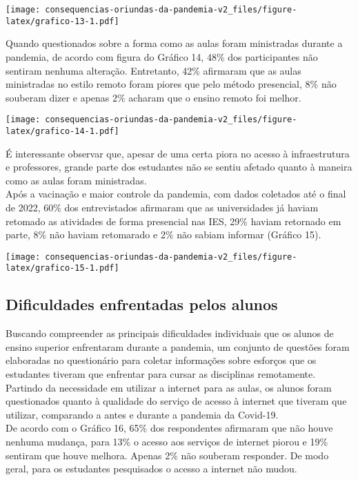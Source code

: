 \documentclass[
]{article}
\begin{document}
\texttt{[image: consequencias-oriundas-da-pandemia-v2\_files/figure-latex/grafico-13-1.pdf]}

Quando questionados sobre a forma como as aulas foram ministradas
durante a pandemia, de acordo com figura do Gráfico 14, 48\% dos
participantes não sentiram nenhuma alteração. Entretanto, 42\% afirmaram
que as aulas ministradas no estilo remoto foram piores que pelo método
presencial, 8\% não souberam dizer e apenas 2\% acharam que o ensino
remoto foi melhor.

\texttt{[image: consequencias-oriundas-da-pandemia-v2\_files/figure-latex/grafico-14-1.pdf]}

É interessante observar que, apesar de uma certa piora no acesso à
infraestrutura e professores, grande parte dos estudantes não se sentiu
afetado quanto à maneira como as aulas foram ministradas.\\
Após a vacinação e maior controle da pandemia, com dados coletados até o
final de 2022, 60\% dos entrevistados afirmaram que as universidades já
haviam retomado as atividades de forma presencial nas IES, 29\% haviam
retornado em parte, 8\% não haviam retomarado e 2\% não sabiam informar
(Gráfico 15).

\texttt{[image: consequencias-oriundas-da-pandemia-v2\_files/figure-latex/grafico-15-1.pdf]}

\hypertarget{dificuldades-enfrentadas-pelos-alunos}{%
\subsection{Dificuldades enfrentadas pelos
alunos}\label{dificuldades-enfrentadas-pelos-alunos}}

Buscando compreender as principais dificuldades individuais que os
alunos de ensino superior enfrentaram durante a pandemia, um conjunto de
questões foram elaboradas no questionário para coletar informações sobre
esforços que os estudantes tiveram que enfrentar para cursar as
disciplinas remotamente.\\
Partindo da necessidade em utilizar a internet para as aulas, os alunos
foram questionados quanto à qualidade do serviço de acesso à internet
que tiveram que utilizar, comparando a antes e durante a pandemia da
Covid-19.\\
De acordo com o Gráfico 16, 65\% dos respondentes afirmaram que não
houve nenhuma mudança, para 13\% o acesso aos serviços de internet
piorou e 19\% sentiram que houve melhora. Apenas 2\% não souberam
responder. De modo geral, para os estudantes pesquisados o acesso a
internet não mudou.
\end{document}
